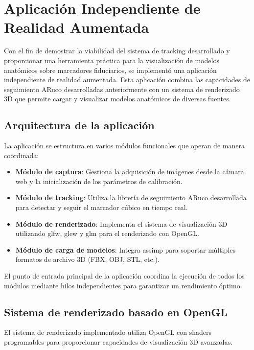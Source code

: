 \section{Aplicación Independiente de Realidad Aumentada}
\label{sec:aplicacion_independiente}

Con el fin de demostrar la viabilidad del sistema de \gls{tracking} desarrollado y proporcionar una herramienta práctica para la visualización de modelos anatómicos sobre marcadores fiduciarios, se implementó una aplicación independiente de realidad aumentada. Esta aplicación combina las capacidades de seguimiento ARuco desarrolladas anteriormente con un sistema de renderizado 3D que permite cargar y visualizar modelos anatómicos de diversas fuentes.

\subsection{Arquitectura de la aplicación}

La aplicación se estructura en varios módulos funcionales que operan de manera coordinada:

\begin{itemize}
    \item \textbf{Módulo de captura}: Gestiona la adquisición de imágenes desde la cámara web y la inicialización de los parámetros de calibración.
    \item \textbf{Módulo de tracking}: Utiliza la librería de seguimiento ARuco desarrollada para detectar y seguir el marcador cúbico en tiempo real.
    \item \textbf{Módulo de renderizado}: Implementa el sistema de visualización 3D utilizando \acrshort{glfw}, \acrshort{glew} y \acrshort{glm} para el renderizado con OpenGL.
    \item \textbf{Módulo de carga de modelos}: Integra \acrshort{assimp} para soportar múltiples formatos de archivo 3D (FBX, OBJ, STL, etc.).
\end{itemize}

El punto de entrada principal de la aplicación coordina la ejecución de todos los módulos mediante hilos independientes para garantizar un rendimiento óptimo.

\subsection{Sistema de renderizado basado en OpenGL}

El sistema de renderizado implementado utiliza OpenGL con shaders programables para proporcionar capacidades de visualización 3D avanzadas.

